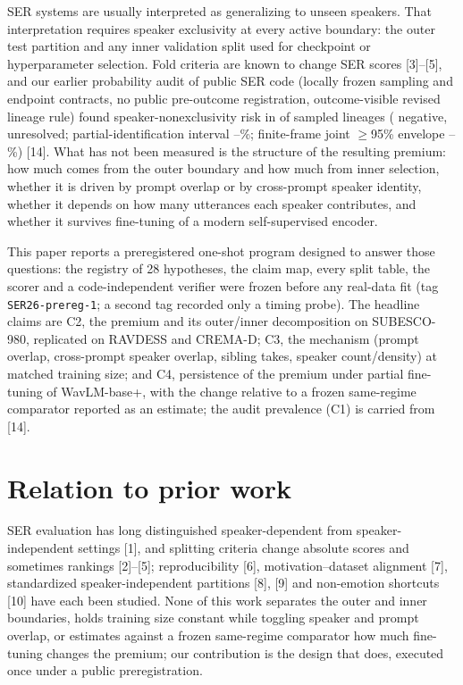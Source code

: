 \documentclass{article}
\begin{document}
SER systems are usually interpreted as generalizing to unseen speakers.
That interpretation requires speaker exclusivity at every active boundary: the outer test partition and any inner validation split used for checkpoint or hyperparameter selection.
Fold criteria are known to change SER scores [3]--[5], and our earlier probability audit of public SER code (locally frozen sampling and endpoint contracts, no public pre-outcome registration, outcome-visible revised lineage rule) found speaker-nonexclusivity risk in \SOneYes{} of \SOneSampleN{} sampled lineages (\SOneNo{} negative, \SOneUnknown{} unresolved; partial-identification interval \SOnePartialLowPct--\SOnePartialHighPct\%; finite-frame joint $\geq$95\% envelope \SOneEnvelopeLowPct--\SOneEnvelopeHighPct\%) [14].
What has not been measured is the structure of the resulting premium: how much comes from the outer boundary and how much from inner selection, whether it is driven by prompt overlap or by cross-prompt speaker identity, whether it depends on how many utterances each speaker contributes, and whether it survives fine-tuning of a modern self-supervised encoder.

This paper reports a preregistered one-shot program designed to answer those questions: the registry of 28 hypotheses, the claim map, every split table, the scorer and a code-independent verifier were frozen before any real-data fit (tag \texttt{SER26-prereg-1}; a second tag recorded only a timing probe).
The headline claims are C2, the premium and its outer/inner decomposition on SUBESCO-980, replicated on RAVDESS and CREMA-D; C3, the mechanism (prompt overlap, cross-prompt speaker overlap, sibling takes, speaker count/density) at matched training size; and C4, persistence of the premium under partial fine-tuning of WavLM-base+, with the change relative to a frozen same-regime comparator reported as an estimate; the audit prevalence (C1) is carried from [14].

\section{Relation to prior work}

SER evaluation has long distinguished speaker-dependent from speaker-independent settings [1], and splitting criteria change absolute scores and sometimes rankings [2]--[5]; reproducibility [6], motivation--dataset alignment [7], standardized speaker-independent partitions [8], [9] and non-emotion shortcuts [10] have each been studied.
None of this work separates the outer and inner boundaries, holds training size constant while toggling speaker and prompt overlap, or estimates against a frozen same-regime comparator how much fine-tuning changes the premium; our contribution is the design that does, executed once under a public preregistration.
\end{document}
